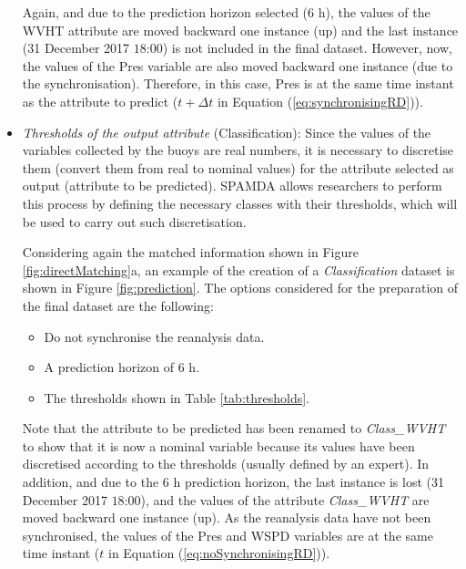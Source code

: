 \documentclass[energies,article,accept,moreauthors,pdftex]{Definitions/mdpi}
\begin{document}
\begin{paracol}{2}
\begin{itemize}
						Again, and due to the prediction horizon selected ($6$ h), the values of the WVHT attribute are moved backward one instance (up) and the last instance (31 December 2017 $18$:$00$) is not included in the final dataset. However, now, the values of the Pres variable are also moved backward one instance (due to the synchronisation). Therefore, in this case, Pres is at the same time instant as the attribute to predict (${t+\Delta t}$ in Equation (\ref{eq:synchronisingRD})).
						
						\item \textit{Thresholds of the output attribute} (Classification): Since the values of the variables collected by the buoys are real numbers, it is necessary to discretise them (convert them from real to nominal values) for the attribute selected as output (attribute to be predicted). SPAMDA allows researchers to perform this process by defining the necessary classes with their thresholds, which will be used to carry out such discretisation.
						
						Considering again the matched information shown in Figure \ref{fig:directMatching}a, an example of the creation of a \textit{Classification} dataset is shown in Figure \ref{fig:prediction}. The options considered for the preparation of the final dataset are the following:
							\begin{itemize}
								\item Do not synchronise the reanalysis data.
								\item A prediction horizon of $6$ h.
								\item The thresholds shown in Table \ref{tab:thresholds}.
							\end{itemize}

						
						
						
						Note that the attribute to be predicted has been renamed to \textit{Class\_WVHT} to show that it is now a nominal variable because its values have been discretised according to the thresholds (usually defined by an expert). In addition, and due to the $6$ h prediction horizon, the last instance is lost (31 December 2017 $18$:$00$), and the values of the attribute \textit{Class\_WVHT} are moved backward one instance (up). As the reanalysis data have not been synchronised, the values of the Pres and WSPD variables are at the same time instant ($t$ in Equation (\ref{eq:noSynchronisingRD})).
						
					\end{itemize}
				

\end{paracol}
\end{document}
